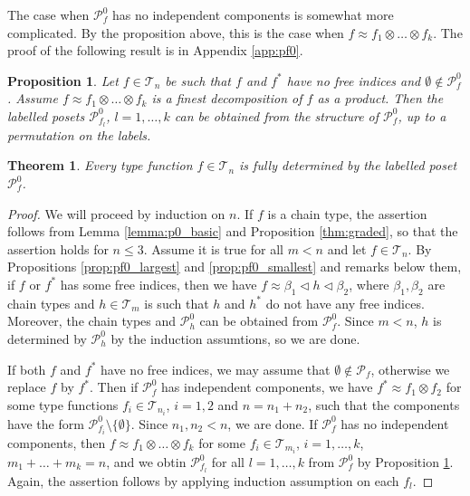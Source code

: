 \documentclass[12pt]{article}
\newtheorem{theorem}{Theorem}
\newtheorem{prop}{Proposition}
\theoremstyle{definition}
\theoremstyle{remark}
\def\Te{\mathcal T}
\def\Pe{\mathcal P}
\def\vtl{\vartriangleleft}
\begin{document}
 The case when $\Pe_f^0$ has no independent components is somewhat more complicated.
 By the proposition  above, this
is the case when $f\approx f_1\otimes\dots\otimes f_k$. The proof of the following result is in Appendix \ref{app:pf0}.

\begin{prop}\label{prop:nofree_product}  Let $f\in \Te_n$ be such that $f$ and $f^*$ have
no free indices and $\emptyset\notin \Pe_f^0$. Assume $f\approx f_1\otimes
\dots\otimes f_k$ is a finest decomposition of $f$ as a product.  Then the labelled posets
$\Pe_{f_l}^0$, $l=1,\dots,k$ can be obtained from the structure of $\Pe_f^0$, up to a
permutation on the labels.

\end{prop}



\begin{theorem}\label{thm:pf0} Every type function $f\in \Te_n$ is fully determined by the
labelled poset $\Pe_f^0$.  

\end{theorem}

\begin{proof}  We will proceed by induction on
$n$. If $f$ is a chain type, the assertion follows from Lemma
\ref{lemma:p0_basic} and Proposition \ref{thm:graded}, so that the assertion holds for
$n\le 3$. Assume it is true for all $m<n$ and let $f\in \Te_n$. By Propositions
\ref{prop:pf0_largest} and \ref{prop:pf0_smallest} and remarks below them, if $f$ or
$f^*$ has
some free indices, then we have $f\approx \beta_1\vtl h \vtl \beta_2$, where $\beta_1,\beta_2$
are chain types and $h\in \Te_m$ is such that $h$ and $h^*$ do not have any free indices.
Moreover,  the chain types and $\Pe_h^0$ 
 can be obtained from $\Pe_f^0$. Since $m<n$,  $h$ is
 determined by $\Pe_h^0$ by the induction assumtions, so we are done.


If both $f$ and $f^*$ have no free indices, we may assume that $\emptyset \notin \Pe_f$, otherwise we 
replace $f$ by $f^*$. Then if $\Pe_f^0$ has independent components, we have
$f^*\approx f_1\otimes f_2$ for some type functions $f_i\in \Te_{n_i}$, $i=1,2$ and $n=n_1+n_2$,
such that the components have the form $\Pe_{f_i}^0\setminus \{\emptyset\}$. Since
$n_1,n_2<n$, we are done. If $\Pe_f^0$ has no independent components, then
$f\approx f_1\otimes\dots \otimes f_k$ for some $f_i\in \Te_{m_i}$, $i=1,\dots,k$, $m_1+\dots
+m_k=n$, and we obtin   $\Pe_{f_l}^0$ for all $l=1,\dots,k$ from $\Pe_f^0$ by Proposition
\ref{prop:nofree_product}. Again, the assertion follows by applying induction assumption
on each $f_l$.


\end{proof}
\end{document}

